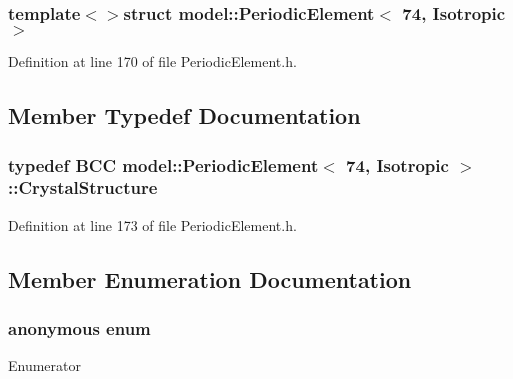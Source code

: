 \subsubsection*{template$<$$>$struct model\+::\+Periodic\+Element$<$ 74, Isotropic $>$}



Definition at line 170 of file Periodic\+Element.\+h.



\subsection{Member Typedef Documentation}
\hypertarget{structmodel_1_1_periodic_element_3_0174_00_01_isotropic_01_4_a3310fc11dcea8779fb20b276a0c1fb5a}{}
\subsubsection[{Crystal\+Structure}]{\setlength{\rightskip}{0pt plus 5cm}typedef {\bf B\+C\+C} {\bf model\+::\+Periodic\+Element}$<$ 74, {\bf Isotropic} $>$\+::{\bf Crystal\+Structure}}\label{structmodel_1_1_periodic_element_3_0174_00_01_isotropic_01_4_a3310fc11dcea8779fb20b276a0c1fb5a}


Definition at line 173 of file Periodic\+Element.\+h.



\subsection{Member Enumeration Documentation}
\hypertarget{structmodel_1_1_periodic_element_3_0174_00_01_isotropic_01_4_ad1732a5fe112afbead81617548f86084}{}\subsubsection[{anonymous enum}]{\setlength{\rightskip}{0pt plus 5cm}anonymous enum}\label{structmodel_1_1_periodic_element_3_0174_00_01_isotropic_01_4_ad1732a5fe112afbead81617548f86084}
\begin{Desc}
\item[Enumerator]\par
\begin{description}
\item[{\em 
\hypertarget{structmodel_1_1_periodic_element_3_0174_00_01_isotropic_01_4_ad1732a5fe112afbead81617548f86084a78e486156dc79805b207f4a846c0bc0e}{}Z\label{structmodel_1_1_periodic_element_3_0174_00_01_isotropic_01_4_ad1732a5fe112afbead81617548f86084a78e486156dc79805b207f4a846c0bc0e}
}]\end{description}
\end{Desc}


